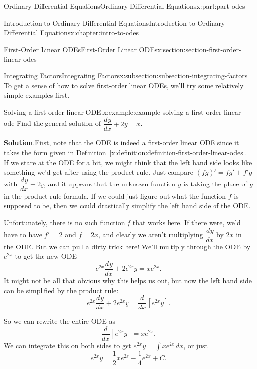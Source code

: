 \documentclass[oneside,10pt,]{book}
\newcommand{\blocktitlefont}{\relax}
\newcommand{\xreffont}{\relax}
\numberwithin{equation}{part}
\newcommand{\dv}[3][]{\dfrac{d^{#1} #2}{d #3^{#1}}}
\begin{document}
\begin{partptx}{Ordinary Differential Equations}{}{Ordinary Differential Equations}{}{}{x:part:part-odes}
\begin{chapterptx}{Introduction to Ordinary Differential Equations}{}{Introduction to Ordinary Differential Equations}{}{}{x:chapter:intro-to-odes}
\begin{sectionptx}{First-Order Linear ODEs}{}{First-Order Linear ODEs}{}{}{x:section:section-first-order-linear-odes}
%
%
\typeout{************************************************}
\typeout{************************************************}
%
\begin{subsectionptx}{Integrating Factors}{}{Integrating Factors}{}{}{x:subsection:subsection-integrating-factors}
To get a sense of how to solve first-order linear ODEs, we'll try some relatively simple examples first.%
\begin{example}{Solving a first-order linear ODE.}{x:example:example-solving-a-first-order-linear-ode}%
Find the general solution of \(\dv{y}{x}+2y = x\).%
\par\smallskip%
\noindent\textbf{\blocktitlefont Solution}.\hypertarget{g:solution:idp105548780060960}{}\quad{}First, note that the ODE is indeed a first-order linear ODE since it takes the form given in \hyperref[x:definition:definition-first-order-linear-odes]{Definition~{\xreffont\ref{x:definition:definition-first-order-linear-odes}}}. If we stare at the ODE for a bit, we might think that the left hand side looks like something we'd get after using the product rule. Just compare \((fg)' = fg'+f'g\) with \(\dv{y}{x}+2y\), and it appears that the unknown function \(y\) is taking the place of \(g\) in the product rule formula. If we could just figure out what the function \(f\) is supposed to be, then we could drastically simplify the left hand side of the ODE.%
\par
Unfortunately, there is no such function \(f\) that works here. If there were, we'd have to have \(f'=2\) and \(f=2x\), and clearly we aren't multiplying \(\dv{y}{x}\) by \(2x\) in the ODE. But we can pull a dirty trick here! We'll multiply through the ODE by \(e^{2x}\) to get the new ODE%
\begin{equation*}
e^{2x}\dv{y}{x}+2e^{2x}y = xe^{2x}.
\end{equation*}
It might not be all that obvious why this helps us out, but now the left hand side can be simplified by the product rule:%
\begin{equation*}
e^{2x}\dv{y}{x}+2e^{2x}y = \dv{}{x}[e^{2x}y].
\end{equation*}
%
\par
So we can rewrite the entire ODE as%
\begin{equation*}
\dv{}{x}[e^{2x}y] = xe^{2x}.
\end{equation*}
We can integrate this on both sides to get \(e^{2x}y = \int xe^{2x}\,dx\), or just%
\begin{equation*}
e^{2x}y = \frac{1}{2}xe^{2x} - \frac{1}{4}e^{2x}+C.

\end{equation*}
\end{example}
\end{subsectionptx}
\end{sectionptx}
\end{chapterptx}
\end{partptx}
\end{document}
